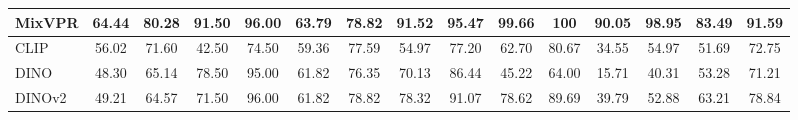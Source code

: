\begin{table}[H]
{\begin{tabular}{lcccccccccccccc}
      MixVPR                                 & 64.44                                                           & 80.28                                                              & 91.50                                                          & 96.00                                                          & 63.79                                                         & 78.82                                                       & \textbf{91.52}                        & \textbf{95.47}           & \textbf{99.66}           & \textbf{100}             & 90.05                    & 98.95                    & 83.49                    & 91.59                    \\ \hline
      CLIP                                   & 56.02                                                           & 71.60                                                              & 42.50                                                          & 74.50                                                          & 59.36                                                         & 77.59                                                       & 54.97                                 & 77.20                    & 62.70                    & 80.67                    & 34.55                    & 54.97                    & 51.69                    & 72.75                    \\
      DINO                                   & 48.30                                                           & 65.14                                                              & 78.50                                                          & 95.00                                                          & 61.82                                                         & 76.35                                                       & 70.13                                 & 86.44                    & 45.22                    & 64.00                    & 15.71                    & 40.31                    & 53.28                    & 71.21                    \\
      DINOv2                                 & 49.21                                                           & 64.57                                                              & 71.50                                                          & 96.00                                                          & 61.82                                                         & 78.82                                                       & 78.32                                 & 91.07                    & 78.62                    & 89.69                    & 39.79                    & 52.88                    & 63.21                    & 78.84                    \\

\end{tabular}}
\end{table}

